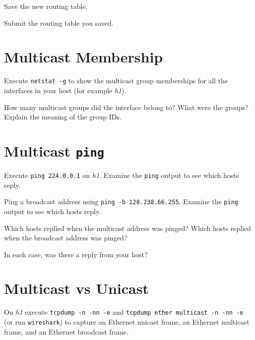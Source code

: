 \documentclass{../UTNetLab}
\begin{document}
    Save the new routing table.
    
    \begin{report}
    \item Submit the routing table you saved.
    \end{report}

\section{Multicast Membership}
    Execute \lstinline{netstat -g} to show the multicast group memberships for all the interfaces in your host (for example \textit{h1}).
    
    \begin{report}
    \item How many multicast groups did the interface belong to? What were the groups? Explain the meaning of the group IDs.
    \end{report}

\section{Multicast \texttt{ping}}
    Execute \lstinline{ping 224.0.0.1} on \textit{h1}.
    Examine the \lstinline{ping} output to see which hosts reply.

    Ping a broadcast address using \lstinline{ping -b 128.238.66.255}.
    Examine the \lstinline{ping} output to see which hosts reply.

    
    \begin{report}
    \item Which hosts replied when the multicast address was pinged?
    Which hosts replied when the broadcast address was pinged?

    \item In each case, was there a reply from your host?
    \end{report}

\section{Multicast vs Unicast}
    On \textit{h1} execute \lstinline{tcpdump -n -nn -e} and \lstinline{tcpdump ether multicast -n -nn -e} (or run \lstinline{wireshark}) to capture an Ethernet unicast frame, an Ethernet multicast frame, and an Ethernet broadcast frame.
\end{document}
